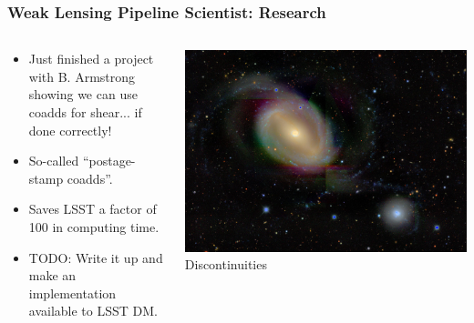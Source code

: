 \documentclass[aspectratio=169]{beamer}
\begin{document}
\frame
{

    \frametitle{Weak Lensing Pipeline Scientist: Research}


    \begin{columns}
        \begin{column}{0.5\textwidth}

            \begin{itemize}

                \item Just finished a project with B. Armstrong showing we can use coadds
                    for shear... if done correctly!
                    
                \item So-called ``postage-stamp
                    coadds''.
                    
                \item Saves LSST a factor of 100 in computing
                    time.
                    
                \item TODO: Write it up and make an implementation
                    available to LSST DM.

            \end{itemize}
        \end{column}
        \begin{column}{0.5\textwidth}
            \begin{center}
                \includegraphics[width=\textwidth,angle=90]{DES0402-4331-discont.jpg}
                \newline
                {\tiny Discontinuities }
            \end{center}
        \end{column}

    \end{columns}

}
\end{document}
